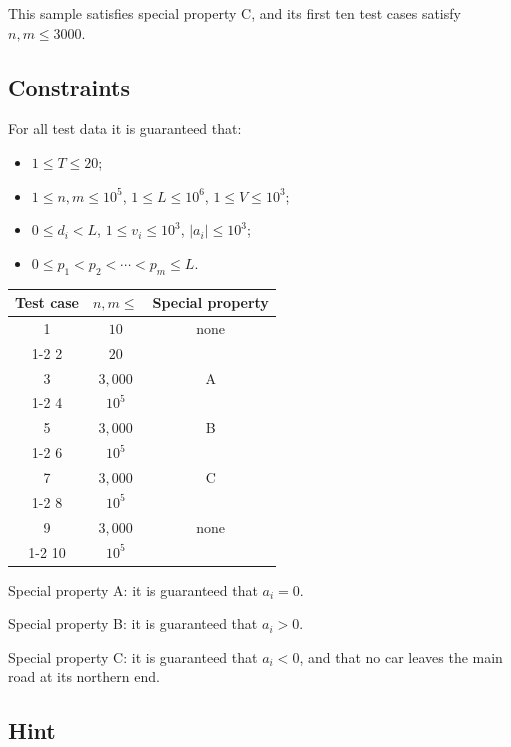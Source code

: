\documentclass[11pt]{article}
\begin{document}
This sample satisfies special property C, and its first ten test cases
satisfy $n, m \le 3000$.

\subsection*{Constraints}

For all test data it is guaranteed that:
\begin{itemize}
\item $1 \le T \le 20$;
\item $1 \le n, m \le 10^5$, $1 \le L \le 10^6$, $1 \le V \le 10^3$;
\item $0 \le d_i < L$, $1 \le v_i \le 10^3$, $|a_i| \le 10^3$;
\item $0 \le p_1 < p_2 < \cdots < p_m \le L$.
\end{itemize}

\begin{center}
\begin{tabular}{|c|c|c|}
\hline
Test case & $n, m \le$ & Special property \\
\hline
1 & $10$ & none \\
\cline{1-2}
2 & $20$ & \\
\hline
3 & $3{,}000$ & A \\
\cline{1-2}
4 & $10^5$ & \\
\hline
5 & $3{,}000$ & B \\
\cline{1-2}
6 & $10^5$ & \\
\hline
7 & $3{,}000$ & C \\
\cline{1-2}
8 & $10^5$ & \\
\hline
9 & $3{,}000$ & none \\
\cline{1-2}
10 & $10^5$ & \\
\hline
\end{tabular}
\end{center}

Special property A: it is guaranteed that $a_i = 0$.

Special property B: it is guaranteed that $a_i > 0$.

Special property C: it is guaranteed that $a_i < 0$, and that no car
leaves the main road at its northern end.

\subsection*{Hint}
\end{document}
